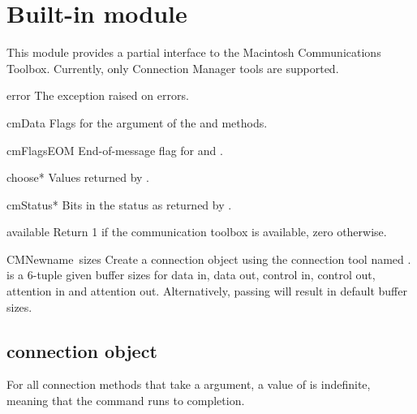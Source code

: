 \section{Built-in module }
\renewcommand{\indexsubitem}{(in module ctb)}

This module provides a partial interface to the Macintosh
Communications Toolbox. Currently, only Connection Manager tools are
supported. 

\begin{datadesc}{error}
The exception raised on errors.
\end{datadesc}

\begin{datadesc}{cmData}
Flags for the  argument of the  and 
methods.
\end{datadesc}

\begin{datadesc}{cmFlagsEOM}
End-of-message flag for  and .
\end{datadesc}

\begin{datadesc}{choose*}
Values returned by .
\end{datadesc}

\begin{datadesc}{cmStatus*}
Bits in the status as returned by .
\end{datadesc}

\begin{funcdesc}{available}{}
Return 1 if the communication toolbox is available, zero otherwise.
\end{funcdesc}

\begin{funcdesc}{CMNew}{name\, sizes}
Create a connection object using the connection tool named
.  is a 6-tuple given buffer sizes for data in,
data out, control in, control out, attention in and attention out.
Alternatively, passing  will result in default buffer sizes.
\end{funcdesc}

\subsection{connection object}
For all connection methods that take a  argument, a value
of  is indefinite, meaning that the command runs to completion.

